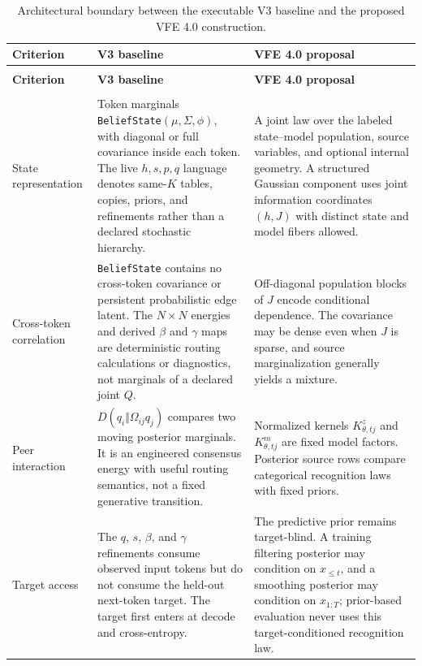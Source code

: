 \begin{longtable}{>{\raggedright\arraybackslash}p{} >{\raggedright\arraybackslash}p{} >{\raggedright\arraybackslash}p{}}
\caption{Architectural boundary between the executable V3 baseline and the proposed VFE 4.0 construction.}
\label{tab:v3-v4-crosswalk}\\
\toprule
\textbf{Criterion} & \textbf{V3 baseline} & \textbf{VFE 4.0 proposal} \\
\midrule
\endfirsthead
\multicolumn{3}{c}{\tablename\ \thetable\ continued}\\
\toprule
\textbf{Criterion} & \textbf{V3 baseline} & \textbf{VFE 4.0 proposal} \\
\midrule
\endhead
\midrule
\multicolumn{3}{r}{Continued on the next page}\\
\endfoot
\bottomrule
\endlastfoot
State representation
& Token marginals \texttt{BeliefState}$(\mu,\Sigma,\phi)$, with diagonal or full covariance inside each token. The live $h,s,p,q$ language denotes same-$K$ tables, copies, priors, and refinements rather than a declared stochastic hierarchy.
& A joint law over the labeled state--model population, source variables, and optional internal geometry. A structured Gaussian component uses joint information coordinates $(h,J)$ with distinct state and model fibers allowed. \\
\addlinespace
Cross-token correlation
& \texttt{BeliefState} contains no cross-token covariance or persistent probabilistic edge latent. The $N\times N$ energies and derived $\beta$ and $\gamma$ maps are deterministic routing calculations or diagnostics, not marginals of a declared joint $Q$.
& Off-diagonal population blocks of $J$ encode conditional dependence. The covariance may be dense even when $J$ is sparse, and source marginalization generally yields a mixture. \\
\addlinespace
Peer interaction
& $D(q_i\Vert\Omega_{ij}q_j)$ compares two moving posterior marginals. It is an engineered consensus energy with useful routing semantics, not a fixed generative transition.
& Normalized kernels $K^z_{\theta,tj}$ and $K^m_{\theta,tj}$ are fixed model factors. Posterior source rows compare categorical recognition laws with fixed priors. \\
\addlinespace
Target access
& The $q$, $s$, $\beta$, and $\gamma$ refinements consume observed input tokens but do not consume the held-out next-token target. The target first enters at decode and cross-entropy.
& The predictive prior remains target-blind. A training filtering posterior may condition on $x_{\leq t}$, and a smoothing posterior may condition on $x_{1:T}$; prior-based evaluation never uses this target-conditioned recognition law. \\

\end{longtable}
